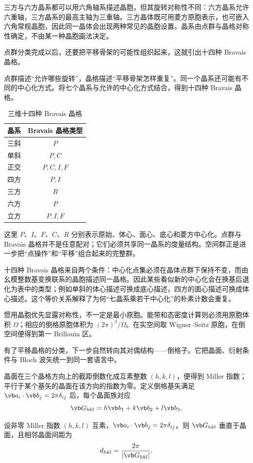三方与六方晶系都可以用六角轴系描述晶胞，但其旋转对称性不同：六方晶系允许六重轴，三方晶系的最高主轴为三重轴。三方晶体既可用菱方原胞表示，也可嵌入六角常规晶胞，因此同一晶体会出现两种常见的晶胞设置。晶系由点群与晶格对称性确定，不由某一种晶胞画法决定。

点群分类完成以后，还要把平移骨架的可能性组织起来，这就引出十四种 Bravais 晶格。

点群描述“允许哪些旋转”，晶格描述“平移骨架怎样重复”。同一个晶系还可能有不同的中心化方式。将七个晶系与允许的中心化方式结合，得到十四种 Bravais 晶格。

\begin{table}[htbp]
\centering
\caption{三维十四种 Bravais 晶格}
\label{tab:14-bravais}
\begin{tabular}{c|c}
\toprule
晶系 & Bravais 晶格类型 \\
\midrule
三斜 & $P$ \\
单斜 & $P,C$ \\
正交 & $P,C,I,F$ \\
四方 & $P,I$ \\
三方 & $R$ \\
六方 & $P$ \\
立方 & $P,I,F$ \\
\bottomrule
\end{tabular}
\end{table}

这里 $P$、$I$、$F$、$C$、$R$ 分别表示原始、体心、面心、底心和菱方中心化。点群与 Bravais 晶格并不是任意配对；它们必须共享同一晶系的度量结构。空间群正是进一步把“点操作”和“平移”组合起来的完整群。

十四种 Bravais 晶格来自两个条件：中心化点集必须在晶体点群下保持不变，而由幺模整数基变换联系的晶胞描述同一晶格。因此某些看似新的中心化会在换基后退化为表中的类型；例如单斜的体心描述可换成底心描述，四方的面心描述可换成体心描述。这个等价关系解释了为何“七晶系乘若干中心化”的朴素计数会重复。

惯用晶胞优先显露对称性，不一定是最小原胞。能带和态密度计算则必须用原胞体积 $\Omega$；相应的倒格原胞体积为 $(2\pi)^3/\Omega$。在实空间取 Wigner--Seitz 原胞，在倒空间便得到第一 Brillouin 区。

有了平移晶格的分类，下一步自然转向其对偶结构——倒格子。它把晶面、衍射条件与 Bloch 波矢统一到同一套语言中。

晶面在三个晶格方向上的截距倒数化成互素整数 $(h,k,l)$，便得到 Miller 指数；平行于某个基矢的晶面在该方向的指数为零。定义倒格基矢满足 $\vb a_i\cdot\vb b_j=2\pi\delta_{ij}$ 后，每个晶面族对应
\[
\vb G_{hkl}=h\vb b_1+k\vb b_2+l\vb b_3,
\]
\begin{proposition}[晶面法向与面间距]
设非零 Miller 指数 $(h,k,l)$ 互素，$\vb a_i\cdot\vb b_j=2\pi\delta_{ij}$。则 $\vb G_{hkl}$ 垂直于晶面，且相邻晶面间距为
\[
d_{hkl}=\frac{2\pi}{|\vb G_{hkl}|}.
\]
\end{proposition}

